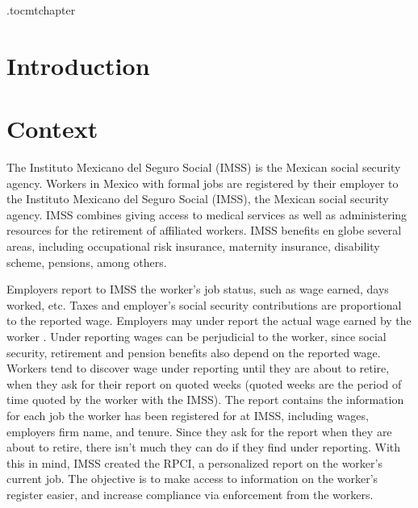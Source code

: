 \documentclass[oneside,11pt]{article}
\begin{document}








\newpage

\etocdepthtag.toc{mtchapter}



\section{Introduction}


\section{Context} \label{sec:context}
The Instituto Mexicano del Seguro Social (IMSS) is the Mexican social security agency.  Workers in Mexico with formal jobs are registered by their employer to the Instituto Mexicano del Seguro Social (IMSS), the Mexican social security agency. IMSS combines giving access to medical services as well as administering resources for the retirement of affiliated workers. IMSS benefits en globe several areas, including occupational risk insurance, maternity insurance, disability scheme, pensions, among others.

Employers report to IMSS the worker's job status, such as wage earned, days worked, etc. Taxes and employer's social security contributions are proportional to the reported wage.  Employers may under report the actual wage earned by the worker \citep{kumler2020enlisting}. Under reporting wages can be perjudicial to the worker, since social security, retirement and pension benefits also depend on the reported wage. Workers tend to discover wage under reporting until they are about to retire, when they ask for their report on quoted weeks (quoted weeks are the period of time quoted by the worker with the IMSS). The report contains the information for each job the worker has been registered for at IMSS, including wages, employers firm name, and tenure. Since they ask for the report when they are about to retire, there isn't much they can do if they find under reporting. With this in mind, IMSS created the RPCI, a personalized report on the worker's current job. The objective is to make access to information on the worker's register easier, and increase compliance via enforcement from the workers.
\end{document}
